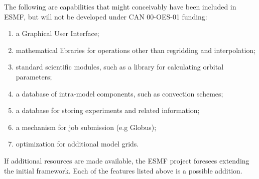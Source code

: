 The following are capabilities that might conceivably have been
included in ESMF, but will not be developed under CAN 00-OES-01
funding:
\begin{enumerate}
\item a Graphical User Interface;
\item mathematical libraries for operations other than regridding and
  interpolation;
\item standard scientific modules, such as a library for calculating
  orbital parameters;
\item a database of intra-model components, such as convection schemes;
\item a database for storing experiments and related information;
\item a mechanism for job submission (e.g Globus);
\item optimization for additional model grids.
\end{enumerate}

If additional resources are made available, the ESMF project foresees
extending the initial framework.  Each of the features listed above is
a possible addition.




















